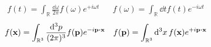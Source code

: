 
\begin{align}
	f(t)
	=
	\int_{\mathbb{R}}\frac{\dd{\omega}}{2\pi}
	f(\omega)
	e^{+i\omega t}
	&&
	f(\omega)
	=
	\int_{\mathbb{R}}\dd{t}
	f(t)
	e^{-i\omega t}
\end{align}
\begin{align}
	f(\vb{x})
	=
	\int_{\mathbb{R}^3}\frac{\dd[3]{p}}{(2\pi)^3}
	f(\vb{p})
	e^{-i\vb{p}\vdot\vb{x}}
	&&
	f(\vb{p})
	=
	\int_{\mathbb{R}^3}\dd[3]{x}
	f(\vb{x})
	e^{+i\vb{p}\vdot\vb{x}}
\end{align}